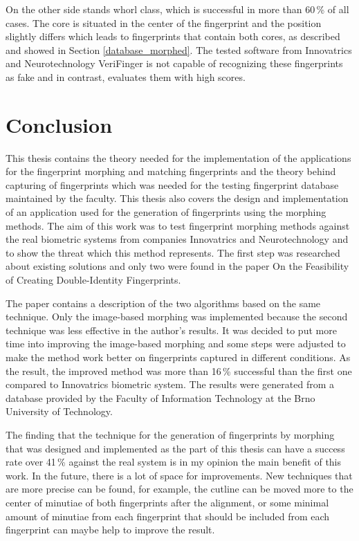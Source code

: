 On the other side stands whorl class, which is successful in more than 60\,\% of all cases. The core is situated in the center of the fingerprint and the position slightly differs which leads to fingerprints that contain both cores, as described and showed in Section \ref{database_morphed}. The tested software from Innovatrics and Neurotechnology VeriFinger is not capable of recognizing these fingerprints as fake and in contrast, evaluates them with high scores.

\chapter{Conclusion}
This thesis contains the theory needed for the implementation of the applications for the fingerprint morphing and matching fingerprints and the theory behind capturing of fingerprints which was needed for the testing fingerprint database maintained by the faculty. This thesis also covers the design and implementation of an application used for the generation of fingerprints using the morphing methods. The aim of this work was to test fingerprint morphing methods against the real biometric systems from companies Innovatrics and Neurotechnology and to show the threat which this method represents. The first step was researched about existing solutions and only two were found in the paper On the Feasibility of Creating Double-Identity Fingerprints. 

The paper contains a description of the two algorithms based on the same technique. Only the image-based morphing was implemented because the second technique was less effective in the author’s results. It was decided to put more time into improving the image-based morphing and some steps were adjusted to make the method work better on fingerprints captured in different conditions. As the result, the improved method was more than 16\,\% successful than the first one compared to Innovatrics biometric system. The results were generated from a database provided by the Faculty of Information Technology at the Brno University of Technology. 

The finding that the technique for the generation of fingerprints by morphing that was designed and implemented as the part of this thesis can have a success rate over 41\,\% against the real system is in my opinion the main benefit of this work. In the future, there is a lot of space for improvements. New techniques that are more precise can be found, for example, the cutline can be moved more to the center of minutiae of both fingerprints after the alignment, or some minimal amount of minutiae from each fingerprint that should be included from each fingerprint can maybe help to improve the result.

